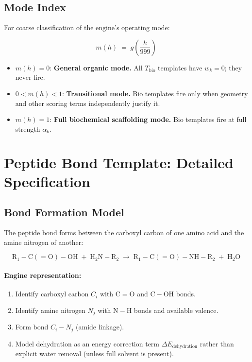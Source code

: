 \documentclass[11pt]{article}
\begin{document}
\subsection{Mode Index}

For coarse classification of the engine's operating mode:

\begin{equation}
\label{eq:mode}
m(h) \;=\; g\!\!\left(\frac{h}{999}\right)
\end{equation}

\begin{itemize}
\item $m(h) = 0$: \textbf{General organic mode.}  All $T_{\mathrm{bio}}$
      templates have $w_k = 0$; they never fire.
\item $0 < m(h) < 1$: \textbf{Transitional mode.}  Bio templates fire only
      when geometry and other scoring terms independently justify it.
\item $m(h) = 1$: \textbf{Full biochemical scaffolding mode.}  Bio templates
      fire at full strength $\alpha_k$.
\end{itemize}

\section{Peptide Bond Template: Detailed Specification}

\subsection{Bond Formation Model}

The peptide bond forms between the carboxyl carbon of one amino acid and
the amine nitrogen of another:

\begin{equation}
\mathrm{R_1-C(=O)-OH} \;+\; \mathrm{H_2N-R_2}
\;\longrightarrow\;
\mathrm{R_1-C(=O)-NH-R_2} \;+\; \mathrm{H_2O}
\end{equation}

\paragraph{Engine representation:}
\begin{enumerate}
\item Identify carboxyl carbon $C_i$ with $\mathrm{C{=}O}$ and
      $\mathrm{C{-}OH}$ bonds.
\item Identify amine nitrogen $N_j$ with $\mathrm{N{-}H}$ bonds and
      available valence.
\item Form bond $C_i{-}N_j$ (amide linkage).
\item Model dehydration as an energy correction term
      $\Delta E_{\mathrm{dehydration}}$ rather than explicit water removal
      (unless full solvent is present).
\end{enumerate}
\end{document}
